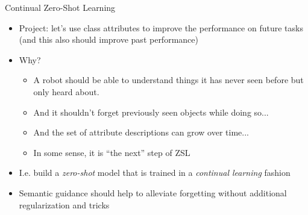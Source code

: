 \documentclass[10pt]{beamer}
\begin{document}
\begin{frame}{Continual Zero-Shot Learning}
    \begin{itemize}
        \item\pause Project: let's use class attributes to improve the performance on future tasks (and this also should improve past performance)
        \item\pause Why?
            \begin{itemize}
                \item\pause A robot should be able to understand things it has never seen before but only heard about.
                \item\pause And it shouldn't forget previously seen objects while doing so...
                \item\pause And the set of attribute descriptions can grow over time...
                \item\pause In some sense, it is ``the next'' step of ZSL
            \end{itemize}
        \item\pause I.e. build a \textit{zero-shot} model that is trained in a \textit{continual learning} fashion
        \item\pause Semantic guidance should help to alleviate forgetting without additional regularization and tricks
    \end{itemize}
\end{frame}

\end{document}
